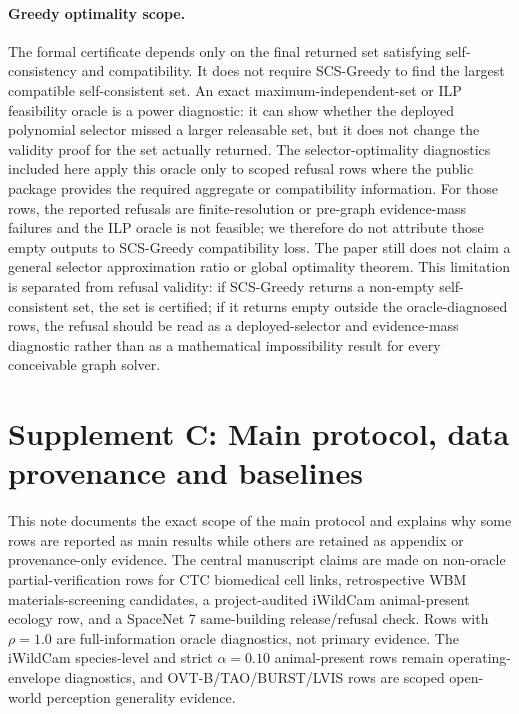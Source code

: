 \documentclass[11pt]{article}
\begin{document}
\paragraph{Greedy optimality scope.}
The formal certificate depends only on the final returned set satisfying self-consistency and compatibility.
It does not require SCS-Greedy to find the largest compatible self-consistent set.
An exact maximum-independent-set or ILP feasibility oracle is a power diagnostic: it can show whether the deployed polynomial selector missed a larger releasable set, but it does not change the validity proof for the set actually returned.
The selector-optimality diagnostics included here apply this oracle only to scoped refusal rows where the public package provides the required aggregate or compatibility information.
For those rows, the reported refusals are finite-resolution or pre-graph evidence-mass failures and the ILP oracle is not feasible; we therefore do not attribute those empty outputs to SCS-Greedy compatibility loss.
The paper still does not claim a general selector approximation ratio or global optimality theorem.
This limitation is separated from refusal validity: if SCS-Greedy returns a non-empty self-consistent set, the set is certified; if it returns empty outside the oracle-diagnosed rows, the refusal should be read as a deployed-selector and evidence-mass diagnostic rather than as a mathematical impossibility result for every conceivable graph solver.

\clearpage

\section*{Supplement C: Main protocol, data provenance and baselines}

This note documents the exact scope of the main protocol and explains why some rows are reported as main results while others are retained as appendix or provenance-only evidence.
The central manuscript claims are made on non-oracle partial-verification rows for CTC biomedical cell links, retrospective WBM materials-screening candidates, a project-audited iWildCam animal-present ecology row, and a SpaceNet 7 same-building release/refusal check.
Rows with \(\rho=1.0\) are full-information oracle diagnostics, not primary evidence.
The iWildCam species-level and strict \(\alpha=0.10\) animal-present rows remain operating-envelope diagnostics, and OVT-B/TAO/BURST/LVIS rows are scoped open-world perception generality evidence.
\end{document}
